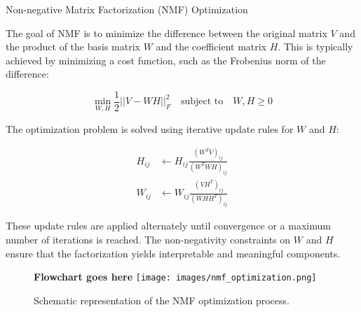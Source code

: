 \documentclass{if-beamer}
\begin{document}
\begin{frame}{Non-negative Matrix Factorization (NMF) Optimization}

The goal of NMF is to minimize the difference between the original matrix $V$ and the product of the basis matrix $W$ and the coefficient matrix $H$. This is typically achieved by minimizing a cost function, such as the Frobenius norm of the difference:

\begin{equation*}
\min_{W,H} \frac{1}{2} ||V - WH||_F^2 \quad \text{subject to} \quad W,H \geq 0
\end{equation*}

The optimization problem is solved using iterative update rules for $W$ and $H$:

\begin{align*}
H_{ij} &\leftarrow H_{ij} \frac{(W^T V)_{ij}}{(W^T W H)_{ij}} \\
W_{ij} &\leftarrow W_{ij} \frac{(V H^T)_{ij}}{(W H H^T)_{ij}}
\end{align*}

These update rules are applied alternately until convergence or a maximum number of iterations is reached. The non-negativity constraints on $W$ and $H$ ensure that the factorization yields interpretable and meaningful components.

\begin{figure}[h]
    \centering
    \textbf{Flowchart goes here}
    \texttt{[image: images/nmf\_optimization.png]}
    \caption{Schematic representation of the NMF optimization process.}
\end{figure}

\end{frame}
\end{document}
